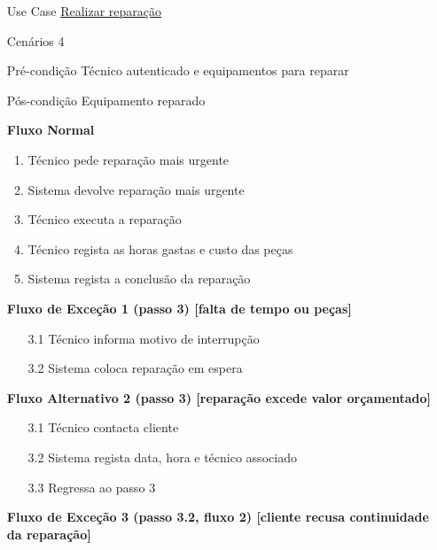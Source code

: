 \documentclass[../relatorio.tex]{subfiles}
\begin{document}
\begin{itemize}
    \item[Use Case] {\underline{Realizar reparação}}
    \item[Cenários] {4}
    \item[Pré-condição] {Técnico autenticado e equipamentos para reparar}
    \item[Pós-condição] {Equipamento reparado}
          \begin{flushleft}
              \textbf{Fluxo Normal}
          \end{flushleft}
          \begin{enumerate}
              \item Técnico pede reparação mais urgente
              \item Sistema devolve reparação mais urgente
              \item Técnico executa a reparação
              \item Técnico regista as horas gastas e custo das peças
              \item Sistema regista a conclusão da reparação
          \end{enumerate}
          \begin{flushleft}
              \textbf{Fluxo de Exceção 1 (passo 3) [falta de tempo ou peças]}
          \end{flushleft}
          \begin{itemize}
              \item[3.1]{Técnico informa motivo de interrupção}
              \item[3.2]{Sistema coloca reparação em espera}
          \end{itemize}
          \begin{flushleft}
              \textbf{Fluxo Alternativo 2 (passo 3) [reparação excede valor orçamentado]}
          \end{flushleft}
          \begin{itemize}
              \item[3.1]{Técnico contacta cliente}
              \item[3.2]{Sistema regista data, hora e técnico associado}
              \item[3.3]{Regressa ao passo 3}
          \end{itemize}
          \begin{flushleft}
              \textbf{Fluxo de Exceção 3 (passo 3.2, fluxo 2) [cliente recusa continuidade da reparação]}

\end{flushleft}
\end{itemize}
\end{document}
